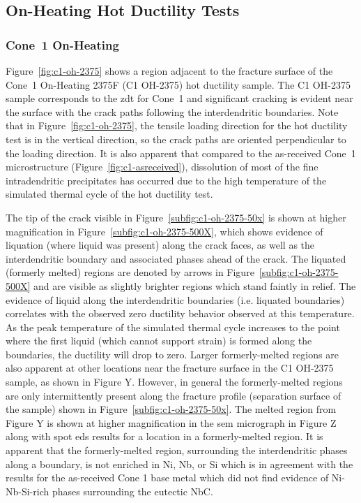 \subsection{On-Heating Hot Ductility Tests}
\subsubsection{Cone~1 On-Heating}
Figure~\ref{fig:c1-oh-2375} shows a region adjacent to the fracture surface of the Cone~1 On-Heating 2375\textdegree{}F (C1 OH-2375) hot ductility sample. The C1 OH-2375 sample corresponds to the \gls{zdt} for Cone~1 and significant cracking is evident near the surface with the crack paths following the interdendritic boundaries. Note that in Figure~\ref{fig:c1-oh-2375}, the tensile loading direction for the hot ductility test is in the vertical direction, so the crack paths are oriented perpendicular to the loading direction. It is also apparent that compared to the as-received Cone~1 microstructure (Figure~\ref{fig:c1-asreceived}), dissolution of most of the fine intradendritic precipitates has occurred due to the high temperature of the simulated thermal cycle of the hot ductility test.

The tip of the crack visible in Figure~\ref{subfig:c1-oh-2375-50x} is shown at higher magnification in Figure~\ref{subfig:c1-oh-2375-500X}, which shows evidence of liquation (where liquid was present) along the crack faces, as well as the interdendritic boundary and associated phases ahead of the crack. The liquated (formerly melted) regions are denoted by arrows in Figure~\ref{subfig:c1-oh-2375-500X} and are visible as slightly brighter regions which stand faintly in relief. The evidence of liquid along the interdendritic boundaries (i.e. liquated boundaries) correlates with the observed zero ductility behavior observed at this temperature. As the peak temperature of the simulated thermal cycle increases to the point where the first liquid (which cannot support strain) is formed along the boundaries, the ductility will drop to zero. Larger formerly-melted regions are also apparent at other locations near the fracture surface in the C1 OH-2375 sample, as shown in Figure Y. However, in general the formerly-melted regions are only intermittently present along the fracture profile (separation surface of the sample) shown in Figure~\ref{subfig:c1-oh-2375-50x}. The melted region from Figure Y is shown at higher magnification in the \gls{sem} micrograph in Figure Z along with spot \gls{eds} results for a location in a formerly-melted region. It is apparent that the formerly-melted region, surrounding the interdendritic phases along a boundary, is not enriched in Ni, Nb, or Si which is in agreement with the results for the as-received Cone 1 base metal which did not find evidence of Ni-Nb-Si-rich phases surrounding the eutectic NbC.

